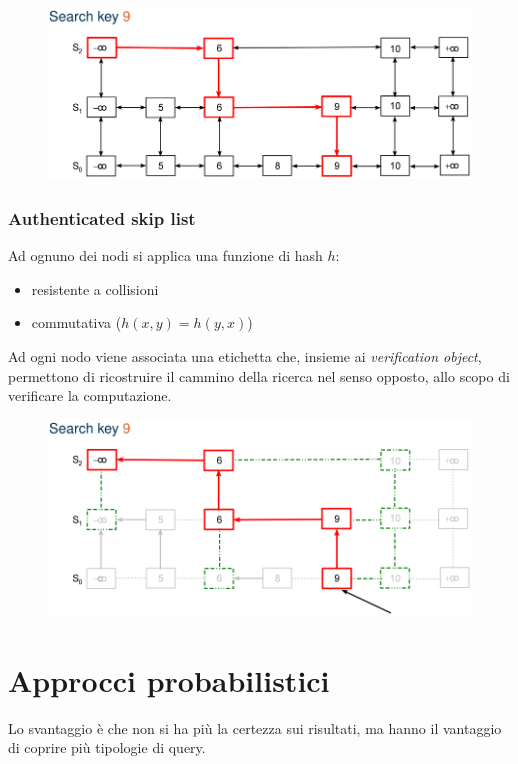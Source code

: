\documentclass{report}
\begin{document}
\begin{figure}[H]
    \centering
    \includegraphics[width=1\linewidth]{images/skip-list.png}
\end{figure}

\subsection{Authenticated skip list}

\noindent Ad ognuno dei nodi si applica una funzione di hash $h$:
\begin{itemize}
    \item resistente a collisioni 
    \item commutativa ($h(x,y)=h(y,x)$)
\end{itemize}

\noindent Ad ogni nodo viene associata una etichetta che, insieme ai \textit{verification object}, permettono di ricostruire il cammino della ricerca 
nel senso opposto, allo scopo di verificare la computazione.

\begin{figure}[H]
    \centering
    \includegraphics[width=1\linewidth]{images/skip-list-auth.png}
\end{figure}



\chapter{Approcci probabilistici}
Lo svantaggio è che non si ha più la certezza sui risultati, ma hanno il vantaggio di coprire 
più tipologie di query. 
\end{document}
